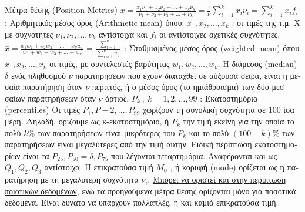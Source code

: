 \documentclass[12pt]{article}
\begin{document}
\begin{flushleft}
	\uline{\textgreek{Μέτρα θέσης} (Position Metrics)} \linebreak 
	\textbullet \quad $\displaystyle \overset{-}{x} = \frac{x_1 \nu_1 + x_2 \nu_2 + \ldots + x_k \nu_k}{\nu_1 + \nu_2 + \nu_3 +\ldots + \nu_k} = \frac{1}{\nu} \sum \limits_{i=1}^k x_i \nu_i = \sum \limits_{i=1}^k x_i f_i $  :  \textgreek{Αριθμητικός μέσος όρος} (Arithmetic mean) \linebreak
	\textgreek{όπου: } $x_1, x_2, \ldots, x_k $  :  \textgreek{οι τιμές της τ.μ. Χ με συχνότητες} $\nu_1, \nu_2, \ldots , \nu_k $ \textgreek{αντίστοιχα και } $f_i$ \textgreek{οι αντίστοιχες σχετικές συχνότητες}. \linebreak 
	\textbullet \quad $\displaystyle \overset{-}{x} = \frac{x_1 w_1 + x_2 w_2 + \ldots + x_{\nu} w_{\nu}}{w_1 + w_2 + w_3 +\ldots + w_{\nu}} = \frac{\sum \limits_{i=1}^{\nu}}{\sum \limits_{i=1}^{\nu} w_i} $  :  \textgreek{Σταθμισμένος μέσος όρος} (weighted mean) \linebreak 
	\textgreek{όπου} $x_1, x_2, \ldots, x_{\nu} $ \textgreek{οι τιμές, με συντελεστές βαρύτητας} $w_1, w_2, \ldots, w_{\nu}$. \linebreak 
	\textbullet \quad \textgreek{Η διάμεσος} (median) $\delta$ \textgreek{ενός πληθυσμού} $\nu$ \textgreek{παρατηρήσεων που έχουν διαταχθεί σε αύξουσα σειρά, είναι η μεσαία παρατήρηση όταν} $\nu$ \textgreek{περιττός, ή ο μέσος όρος (το ημιάθροισμα) των δύο μεσσαίων παρατηρήσεων όταν} $\nu$ \textgreek{άρτιος}. \linebreak 
	\textbullet \quad $P_k\ , \ k=1,2, \ldots , 99 $  :  \textgreek{Εκατοστημόρια} (percentiles) \linebreak 
	\textgreek{Οι τιμές} $P_1, P-2, \ldots , P_{99}$ \textgreek{χωρίζουν τη συνολική συχνότητα σε 100 ίσα μέρη. Δηλαδή, ορίζουμε ως κ-εκατοστημόριο, ή} $P_k$ \textgreek{την τιμή εκείνη για την οποία το πολύ} $k\%$ \textgreek{των παρατηρήσεων είναι μικρότερες του} $P_k$ \textgreek{και το πολύ} $(100-k)\%$ \textgreek{των παρατηρήσεων είναι μεγαλύτερες από την τιμή αυτήν. Ειδική περίπτωση εκατοστημορίων είναι τα} $\displaystyle P_{25}, P_{50} = \delta , P_{75} $ \textgreek{που λέγονται τεταρτημόρια. Αναφέρονται και ως} $Q_1, Q_2, Q_3$ \textgreek{αντίστοιχα.} \linebreak 
	\textbullet \quad \textgreek{Η επικρατούσα τιμή} $M_0$ \textgreek{, ή κορυφή} (mode) \textgreek{ορίζεται ως η παρατήρηση με τη μεγαλύτερη συχνότητα} $\nu_i$. \uline{\textgreek{Μπορεί να οριστεί και στην περίπτωση ποιοτικών δεδομένων}}, \textgreek{ενώ τα προηγούμενα μέτρα θέσης ορίζονται μόνο για ποσοτικά δεδομένα. Είναι δυνατό να υπάρχουν πολλαπλές, ή και καμιά επικρατούσα τιμή.} \linebreak 
	

\end{flushleft}
\end{document}
